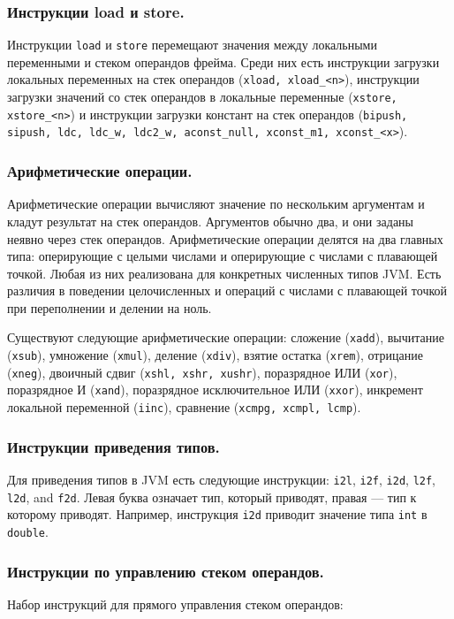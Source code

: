 \subsubsection{Инструкции load и store.}

Инструкции \texttt{load} и \texttt{store} перемещают значения между локальными переменными и стеком операндов фрейма. Среди них есть 
инструкции загрузки локальных переменных на стек операндов (\texttt{xload, xload\_<n>}), инструкции загрузки значений со стек
операндов в локальные переменные (\texttt{xstore, xstore\_<n>}) и инструкции загрузки констант на стек операндов (\texttt{bipush, sipush, ldc, ldc\_w, ldc2\_w, aconst\_null, xconst\_m1, xconst\_<x>}). 

\subsubsection{Арифметические операции.}
Арифметические операции вычисляют значение по нескольким аргументам и кладут результат на стек операндов. Аргументов обычно два, и они заданы неявно через стек операндов. Арифметические операции делятся на два главных типа: оперирующие с целыми числами и оперирующие с числами с плавающей точкой. Любая из них реализована для конкретных численных типов JVM. Есть различия в поведении целочисленных и операций с числами с плавающей точкой при переполнении и делении на ноль. 

Существуют следующие арифметические операции: сложение (\texttt{xadd}), вычитание (\texttt{xsub}), умножение (\texttt{xmul}), деление (\texttt{xdiv}), взятие остатка (\texttt{xrem}), отрицание (\texttt{xneg}), двоичный сдвиг (\texttt{xshl, xshr, xushr}), поразрядное ИЛИ (\texttt{xor}), поразрядное И (\texttt{xand}), поразрядное исключительное ИЛИ (\texttt{xxor}), инкремент локальной переменной (\texttt{iinc}), сравнение (\texttt{xcmpg, xcmpl, lcmp}).

\subsubsection{Инструкции приведения типов.}
Для приведения типов в JVM есть следующие инструкции: \texttt{i2l}, \texttt{i2f}, \texttt{i2d}, \texttt{l2f}, \texttt{l2d}, and \texttt{f2d}. 
Левая буква означает тип, который приводят, правая --- тип к которому приводят. Например,  инструкция \texttt{i2d} приводит значение типа \texttt{int} в \texttt{double}.
  
\subsubsection{Инструкции по управлению стеком операндов.}
Набор инструкций для прямого управления стеком операндов:

